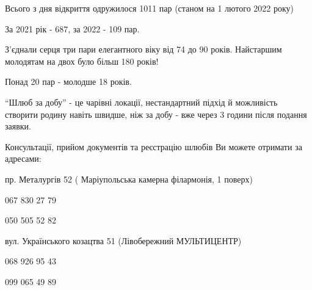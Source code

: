 Всього з дня відкриття одружилося 1011 пар (станом на 1 лютого 2022 року)

За 2021 рік - 687, за 2022 - 109 пар.

З'єднали серця три пари  елегантного віку від 74 до 90 років. Найстаршим
молодятам на двох було більш 180 років!

Понад 20 пар - молодше 18 років.

\enquote{Шлюб за добу} - це чарівні локації, нестандартний підхід й можливість створити
родину навіть швидше, ніж за добу - вже через 3 години після подання заявки. 

Консультації, прийом документів та реєстрацію шлюбів Ви можете отримати за адресами: 

пр. Металургів 52 ( Маріупольська камерна філармонія, 1 поверх) \par
067 830 27 79 \par
050 505 52 82 \par
вул. Українського козацтва 51 (Лівобережний МУЛЬТИЦЕНТР) \par
068 926 95 43 \par
099 065 49 89
